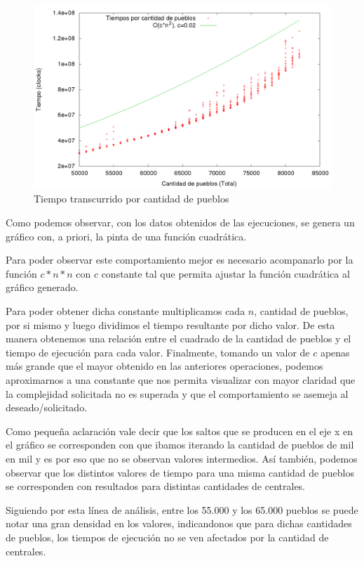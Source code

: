 \begin{center}
\begin{figure}[h!]
\includegraphics[scale=0.4]{./img/ej2_chart.png}
\caption{Tiempo transcurrido por cantidad de pueblos}
\end{figure}
\end{center}





Como podemos observar, con los datos obtenidos de las ejecuciones, se genera un gr\'afico con, a priori, la pinta de una funci\'on cuadr\'atica. 

Para poder observar este comportamiento mejor es necesario acompanarlo por la funci\'on $c*n*n$ con $c$ constante tal que permita ajustar la funci\'on cuadr\'atica al gr\'afico generado.

Para poder obtener dicha constante multiplicamos cada $n$, cantidad de pueblos, por si mismo y luego dividimos el tiempo resultante por dicho valor. De esta manera obtenemos una relaci\'on entre el cuadrado de la cantidad de pueblos y el tiempo de ejecuci\'on para cada valor. 
Finalmente, tomando un valor de $c$ apenas m\'as grande que el mayor obtenido en las anteriores operaciones, podemos aproximarnos a una constante que nos permita visualizar con mayor claridad que la complejidad solicitada no es superada y que el comportamiento se asemeja al deseado/solicitado.

Como peque\~na aclaraci\'on vale decir que los saltos que se producen en el eje x en el gr\'afico se corresponden con que ibamos iterando la cantidad de pueblos de mil en mil y es por eso que no se observan valores intermedios. 
As\'i tambi\'en, podemos observar que los distintos valores de tiempo para una misma cantidad de pueblos se corresponden con resultados para distintas cantidades de centrales.

Siguiendo por esta l\'inea de an\'alisis, entre los 55.000 y los 65.000 pueblos se puede notar una gran densidad en los valores, indicandonos que para dichas cantidades de pueblos, los tiempos de ejecuci\'on no se ven afectados por la cantidad de centrales.

